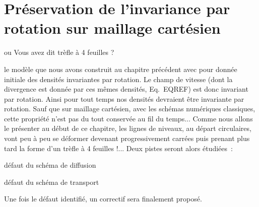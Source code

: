 \documentclass[main.tex]{subfiles}
\begin{document}
\chapter{Préservation de l'invariance par rotation sur maillage cartésien}
\vspace{-13mm}
\begin{flushright}
{ \Large\sf ou Vous avez dit trèfle à 4 feuilles ?\ }
\end{flushright}
%

 le modèle que nous avons construit au chapitre précédent avec pour donnée initiale des densités invariantes par rotation. Le champ de vitesse (dont la divergence est  donnée par ces mêmes densités, \cf Eq.~EQREF) est donc invariant par rotation. Ainsi pour tout temps nos densités devraient être invariante par rotation. Sauf que sur maillage cartésien, avec les schémas numériques classiques, cette propriété n'est pas du tout conservée au fil du temps... Comme nous allons le présenter au début de ce chapitre, les lignes de niveaux, au départ circulaires, vont peu à peu se déformer devenant progressivement carrées puis prenant plus tard la forme d'un trèfle à 4 feuilles !... Deux pistes seront alors étudiées~:
\begin{myitemize}
\item défaut du schéma de diffusion
\item défaut du schéma de transport
\end{myitemize}


\noindent Une fois le défaut identifié, un correctif sera finalement proposé. 
\end{document}
